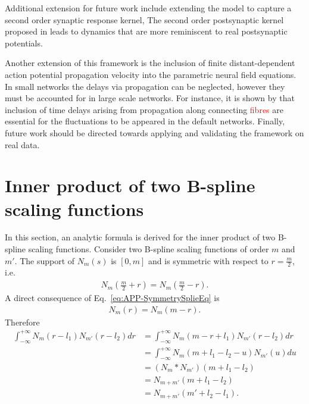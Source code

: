 \documentclass[review,authoryear,3p]{elsarticle}
\newcommand{\parham}[1]{\textcolor{red}{#1}}
\begin{document}
Additional extension for future work include extending the model to capture a second order synaptic response kernel, The second order postsynaptic kernel proposed in \citet{VanRotterdam1982} leads to dynamics that are more reminiscent to real postsynaptic potentials. 

Another extension of this framework is the inclusion of finite distant-dependent action potential propagation velocity into the parametric neural field equations. In small networks the delays via propagation can be neglected, however they must be accounted for in large scale networks. For instance, it is shown by \citet{Ghosh2008} that inclusion of time delays arising from propagation along connecting \parham{fibres} are essential for the fluctuations to be appeared in the default networks. Finally, future work should be directed towards applying and validating the framework on real data.
\newpage
\appendix
\section{Inner product of two B-spline scaling functions}\label{ap:InnerProductOfBsplines}
In this section, an analytic formula is derived for the inner product of two B-spline scaling functions. Consider two B-spline scaling functions of order $m$ and $m'$. The support of $N_m\left(s\right)$ is $\left[ 0,m\right]$ and  is symmetric with respect to $r=\frac{m}{2}$, i.e.
\begin{align}\label{eq:APP-SymmetrySplieEq}
 N_{m}\left(\frac{m}{2}+r\right)=N_{m}\left(\frac{m}{2}-r\right).
\end{align}
A direct consequence of Eq.~\eqref{eq:APP-SymmetrySplieEq} is 
\begin{align}
 N_{m}\left(r\right)=N_{m}\left(m-r\right).
\end{align}
Therefore
\begin{align}
\int_{-\infty}^{+\infty}N_{m}\left(r-l_{1}\right)N_{m'}\left(r-l_{2}\right)dr&=\int_{-\infty}^{+\infty}N_{m}\left(m-r+l_{1}\right)N_{m'}\left(r-l_{2}\right)dr \nonumber \\
&=\int_{-\infty}^{+\infty}N_{m}\left(m+l_{1}-l_{2}-u\right)N_{m'}\left(u\right)du \nonumber \\
&=\left(N_m \ast N_{m'}\right) \left(m+l_{1}-l_{2}\right) \nonumber \\
&=N_{m+m'}\left(m+l_{1}-l_{2}\right) \nonumber \\
&=N_{m+m'}\left(m'+l_{2}-l_{1}\right).
\end{align}
\end{document}

